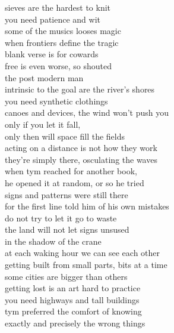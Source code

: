 sieves are the hardest to knit\\
you need patience and wit\\
some of the musics looses magic\\
when frontiers define the tragic\\
blank verse is for cowards\\
free is even worse, so shouted\\
the post modern man\\


intrinsic to the goal are the river's shores\\
you need synthetic clothings\\
canoes and devices, the wind won't push you\\
only if you let it fall,\\
only then will space fill the fields\\
acting on a distance is not how they work\\
they're simply there, osculating the waves\\

when tym reached for another book,\\
he opened it at random, or so he tried\\
signs and patterns were still there\\
for the first line told him of his own mistakes\\
do not try to let it go to waste\\
the land will not let signs unsused\\
in the shadow of the crane\\
at each waking hour we can see each other\\
getting built from small parts, bits at a time\\
some cities are bigger than others\\
getting lost is an art hard to practice\\
you need highways and tall buildings\\
tym preferred the comfort of knowing\\
exactly and precisely the wrong things
